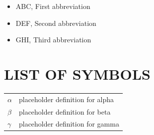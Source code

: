 \documentclass[12pt]{report} %
\begin{document}
  {\singlespacing
    \begin{itemize}[label={}, leftmargin=0pt, itemsep=0pt, parsep=0pt, topsep=0pt]
      \item ABC, First abbreviation
      \item DEF, Second abbreviation
      \item GHI, Third abbreviation
    \end{itemize}
  }
\endgroup

\clearpage

\chapter*{LIST OF SYMBOLS}
\begingroup
  \setlength{\parindent}{0pt}    %
  \vspace*{-0.5\baselineskip}
  {\singlespacing                %
    \begin{tabular}{@{}l@{, }p{}@{}}
      $\alpha$ & placeholder definition for alpha \\
      $\beta$ & placeholder definition for beta \\
      $\gamma$ & placeholder definition for gamma \\
    \end{tabular}
  }
\endgroup
\clearpage

\cleardoublepage
{}
\setcounter{page}{1}







\end{document}
